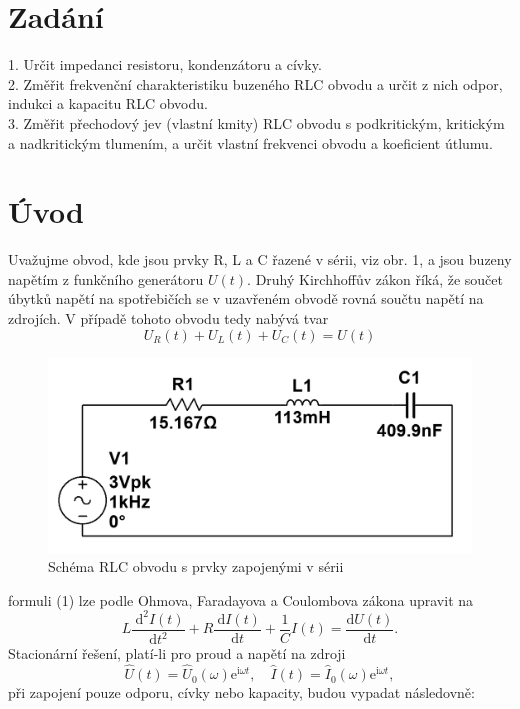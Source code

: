 \documentclass[czech,11pt,a4paper]{article}
\begin{document}
	\begin{multicols}{2}
		\section{Zadání}
		1. Určit impedanci resistoru, kondenzátoru a cívky.\\
		2. Změřit frekvenční charakteristiku buzeného RLC obvodu a určit z nich odpor, indukci a kapacitu RLC obvodu.
		\\
		3. Změřit přechodový jev (vlastní kmity) RLC obvodu s podkritickým, kritickým a nadkritickým tlumením, a určit vlastní frekvenci obvodu a koeficient útlumu.
		
		\section{Úvod}
		Uvažujme obvod, kde jsou prvky R, L a C řazené v sérii, viz obr. 1, a jsou buzeny napětím z funkčního generátoru $U(t)$. Druhý Kirchhoffův zákon říká, že součet úbytků napětí na spotřebičích se v uzavřeném obvodě rovná součtu napětí na zdrojích. V případě tohoto obvodu tedy nabývá tvar
		\begin{equation}
			U_{R}(t)+U_{L}(t)+U_{C}(t)=U(t)
		\end{equation}
		
		\begin{figure}[H]
			\begin{center}
				\includegraphics[max width=0.9\linewidth, center]{obvod1}
				\caption{Schéma RLC obvodu s prvky zapojenými v sérii}
				
			\end{center}
		\end{figure}
		formuli (1) lze podle Ohmova, Faradayova a Coulombova zákona upravit na
		\begin{equation}
			L \frac{\mathrm{~d}^{2} I(t)}{\mathrm{d} t^{2}}+R \frac{\mathrm{~d} I(t)}{\mathrm{d} t}+\frac{1}{C} I(t)=\frac{\mathrm{d} U(t)}{\mathrm{d} t}.
		\end{equation}
		Stacionární řešení, platí-li pro proud a napětí na zdroji
		\begin{equation}
			\hat{U}(t)=\hat{U}_{0}(\omega) \mathrm{e}^{\mathrm{i} \omega t}, \quad \hat{I}(t)=\hat{I}_{0}(\omega) \mathrm{e}^{\mathrm{i} \omega t},
		\end{equation}
		při zapojení pouze odporu, cívky nebo kapacity, budou vypadat následovně:

\end{multicols}
\end{document}
